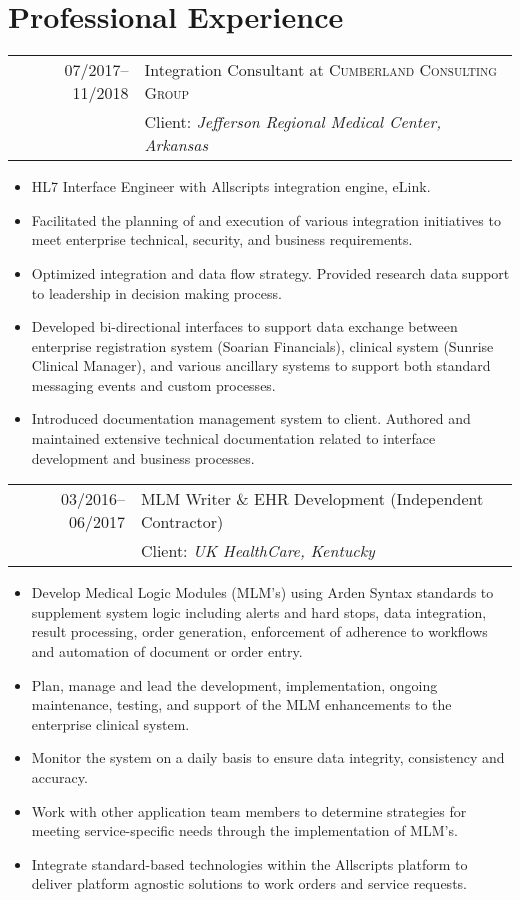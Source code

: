 \documentclass[letter,11pt,DIV=20]{scrartcl}
\begin{document}
\section{Professional Experience}

\begin{tabu}{r|X}
 \textsc{07/2017--11/2018} & Integration Consultant at \textsc{Cumberland Consulting Group}
 \\&Client: \emph{Jefferson Regional Medical Center, Arkansas}
\end{tabu}
{\small
\begin{itemize}[topsep=0pt,nosep,noitemsep]
     \item HL7 Interface Engineer with Allscripts integration engine, eLink.
     \item Facilitated the planning of and execution of various integration initiatives to meet enterprise technical, security, and business requirements.
     \item Optimized integration and data flow strategy. Provided research data support to leadership in decision making process.
     \item Developed bi-directional interfaces to support data exchange between enterprise registration system (Soarian Financials), clinical system (Sunrise Clinical Manager), and various ancillary systems to support both standard messaging events and custom processes.
     \item Introduced documentation management system to client. Authored and maintained extensive technical documentation related to interface development and business processes.
 \end{itemize}
 }

\begin{tabu}{r|X}
 \textsc{03/2016--06/2017} & MLM Writer \& EHR Development (Independent Contractor)
 \\&Client: \emph{UK HealthCare, Kentucky}
\end{tabu}
{\small
\begin{itemize}[topsep=0pt,nosep,noitemsep]
     \item Develop Medical Logic Modules (MLM's) using Arden Syntax standards to supplement system logic including alerts and hard stops, data integration, result processing, order generation, enforcement of adherence to workflows and automation of document or order entry.
     \item Plan, manage and lead the development, implementation, ongoing maintenance, testing, and support of the MLM enhancements to the enterprise clinical system.
     \item Monitor the system on a daily basis to ensure data integrity, consistency and accuracy.
     \item Work with other application team members to determine strategies for meeting service-specific needs through the implementation of MLM's.
     \item Integrate standard-based technologies within the Allscripts platform to deliver platform agnostic solutions to work orders and service requests.
 \end{itemize}
 }
\end{document}
